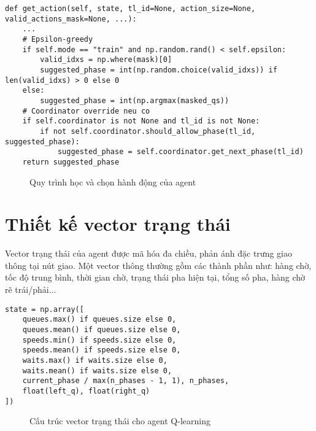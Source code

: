 \begin{lstlisting}[style=py,caption={Chiến lược chọn hành động epsilon-greedy và coordinator mask}]
def get_action(self, state, tl_id=None, action_size=None, valid_actions_mask=None, ...):
    ...
    # Epsilon-greedy
    if self.mode == "train" and np.random.rand() < self.epsilon:
        valid_idxs = np.where(mask)[0]
        suggested_phase = int(np.random.choice(valid_idxs)) if len(valid_idxs) > 0 else 0
    else:
        suggested_phase = int(np.argmax(masked_qs))
    # Coordinator override neu co
    if self.coordinator is not None and tl_id is not None:
        if not self.coordinator.should_allow_phase(tl_id, suggested_phase):
            suggested_phase = self.coordinator.get_next_phase(tl_id)
    return suggested_phase
\end{lstlisting}

\begin{figure}[H]
    \centering
    \caption{Quy trình học và chọn hành động của agent}
\end{figure}

\section{Thiết kế vector trạng thái}

Vector trạng thái của agent được mã hóa đa chiều, phản ánh đặc trưng giao thông tại nút giao. Một vector thông thường gồm các thành phần như: hàng chờ, tốc độ trung bình, thời gian chờ, trạng thái pha hiện tại, tổng số pha, hàng chờ rẽ trái/phải...

\begin{lstlisting}[style=py,caption={Tạo vector trạng thái đầu vào cho agent}]
state = np.array([
    queues.max() if queues.size else 0,
    queues.mean() if queues.size else 0,
    speeds.min() if speeds.size else 0,
    speeds.mean() if speeds.size else 0,
    waits.max() if waits.size else 0,
    waits.mean() if waits.size else 0,
    current_phase / max(n_phases - 1, 1), n_phases,
    float(left_q), float(right_q)
])
\end{lstlisting}

\begin{figure}[H]
    \centering
    \caption{Cấu trúc vector trạng thái cho agent Q-learning}
\end{figure}

